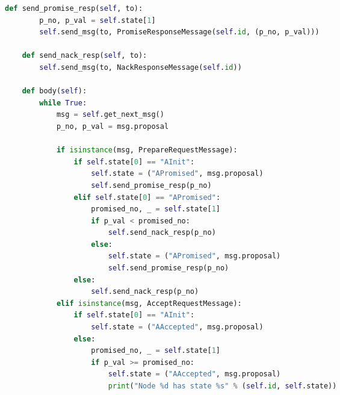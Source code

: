 \begin{landscape}
\begin{multicols*}{2}
\begin{lstlisting}[language=Python]
    def send_promise_resp(self, to):
        p_no, p_val = self.state[1]
        self.send_msg(to, PromiseResponseMessage(self.id, (p_no, p_val)))

    def send_nack_resp(self, to):
        self.send_msg(to, NackResponseMessage(self.id))

    def body(self):
        while True:
            msg = self.get_next_msg()
            p_no, p_val = msg.proposal

            if isinstance(msg, PrepareRequestMessage):
                if self.state[0] == "AInit":
                    self.state = ("APromised", msg.proposal)
                    self.send_promise_resp(p_no)
                elif self.state[0] == "APromised":
                    promised_no, _ = self.state[1]
                    if p_val < promised_no:
                        self.send_nack_resp(p_no)
                    else:
                        self.state = ("APromised", msg.proposal)
                        self.send_promise_resp(p_no)
                else:
                    self.send_nack_resp(p_no)
            elif isinstance(msg, AcceptRequestMessage):
                if self.state[0] == "AInit":
                    self.state = ("AAccepted", msg.proposal)
                else:
                    promised_no, _ = self.state[1]
                    if p_val >= promised_no:
                        self.state = ("AAccepted", msg.proposal)
                        print("Node %d has state %s" % (self.id, self.state))
\end{lstlisting}

\end{multicols*}
\end{landscape}
\restoregeometry
